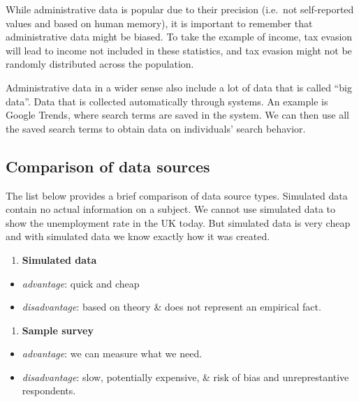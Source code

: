 \documentclass[]{book}
\providecommand{\tightlist}{%
  \setlength{\itemsep}{0pt}\setlength{\parskip}{0pt}}
\begin{document}
While administrative data is popular due to their precision (i.e.~not self-reported values and based on human memory), it is important to remember that administrative data might be biased. To take the example of income, tax evasion will lead to income not included in these statistics, and tax evasion might not be randomly distributed across the population.

Administrative data in a wider sense also include a lot of data that is called ``big data''. Data that is collected automatically through systems. An example is Google Trends, where search terms are saved in the system. We can then use all the saved search terms to obtain data on individuals' search behavior.

\hypertarget{comparison-of-data-sources}{%
\subsection{Comparison of data sources}\label{comparison-of-data-sources}}

The list below provides a brief comparison of data source types. Simulated data contain no actual information on a subject. We cannot use simulated data to show the unemployment rate in the UK today. But simulated data is very cheap and with simulated data we know exactly how it was created.

\begin{enumerate}
\def\labelenumi{\arabic{enumi}.}
\tightlist
\item
  \textbf{Simulated data}
\end{enumerate}

\begin{itemize}
\tightlist
\item
  \emph{advantage}: quick and cheap
\item
  \emph{disadvantage}: based on theory \& does not represent an empirical fact.
\end{itemize}

\begin{enumerate}
\def\labelenumi{\arabic{enumi}.}
\setcounter{enumi}{1}
\tightlist
\item
  \textbf{Sample survey}
\end{enumerate}

\begin{itemize}
\tightlist
\item
  \emph{advantage}: we can measure what we need.
\item
  \emph{disadvantage}: slow, potentially expensive, \& risk of bias and unreprestantive respondents.
\end{itemize}
\end{document}
